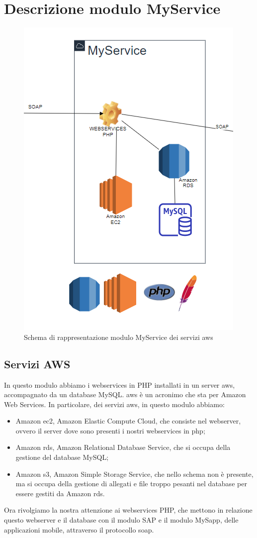 \section{Descrizione modulo MyService}
\begin{figure}[!h] 
	\centering 
	\includegraphics[scale = 1.1]{immagini/modulo-myservice.png} 
	\caption{Schema di rappresentazione modulo MyService dei servizi \gls{aws}}
\end{figure}
\newpage
\subsection{Servizi AWS}
In questo modulo abbiamo i webservices in PHP installati in un server \gls{aws}, accompagnato da un database MySQL.
\gls{aws} è un acronimo che sta per Amazon Web Services.
In particolare, dei servizi \gls{aws}, in questo modulo abbiamo:
\begin{itemize}
	\item Amazon \gls{ec2}, Amazon Elastic Compute Cloud, che consiste nel webserver, ovvero il server dove sono presenti i nostri webservices in php;
	\item Amazon \gls{rds}, Amazon Relational Database Service, che si occupa della gestione del database MySQL;
	\item Amazon \gls{s3}, Amazon Simple Storage Service, che nello schema non è presente, ma si occupa della gestione di allegati e file troppo pesanti nel database per essere gestiti da Amazon \gls{rds}.
\end{itemize}
Ora rivolgiamo la nostra attenzione ai webservices PHP, che mettono in relazione questo webserver e il database con il modulo SAP e il modulo MySapp, delle applicazioni mobile, attraverso il protocollo \gls{soap}.
